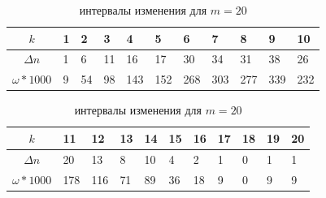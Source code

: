 \documentclass[a4paper, 12pt]{article}
\begin{document}
    \begin{table}[!htbp]
        \centering
        \caption{интервалы изменения для $m = 20$}
        \begin{tabular}{|c|m{1.5em}|m{1.5em}|m{1.5em}|m{1.5em}|m{1.5em}|m{1.5em}|m{1.5em}|m{1.5em}|m{1.5em}|m{1.5em}|}
            \hline
            $k$ & 1 & 2 & 3 & 4 & 5 & 6 & 7 & 8 & 9 & 10 \\
            \hline
            $\Delta n$ & 1 & 6 & 11 & 16 & 17 & 30 & 34 & 31 & 38 & 26\\
            \hline
            $\omega * 1000$ & 9 & 54 & 98 & 143 & 152 & 268 & 303 & 277 & 339 & 232 \\
            \hline
        \end{tabular}
        \begin{tabular}{|c|m{1.5em}|m{1.5em}|m{1.5em}|m{1.5em}|m{1.5em}|m{1.5em}|m{1.5em}|m{1.5em}|m{1.5em}|m{1.5em}|}
            \hline
            $k$ & 11 & 12 & 13 & 14 & 15 & 16 & 17 & 18 & 19 & 20 \\
            \hline
            $\Delta n$ & 20 & 13 & 8 & 10 & 4 & 2 & 1 & 0 & 1 & 1  \\
            \hline
            $\omega * 1000$ & 178 & 116 & 71 & 89 & 36 & 18 & 9 & 0 & 9 & 9 \\
            \hline
        \end{tabular}
    \end{table}
\end{document}

